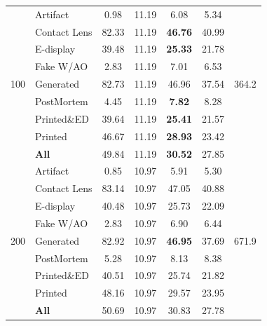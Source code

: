 \begin{table}[!htbp]
\begin{tabular}{l l c c c c c}
\multirow{9}{*}{100}
& Artifact             &   0.98 &  11.19 &           6.08 &    5.34 & \multirow{9}{*}{364.2} \\
& Contact Lens         &  82.33 &  11.19 & \textbf{46.76} &   40.99 &  \\
& E-display            &  39.48 &  11.19 & \textbf{25.33} &   21.78 &  \\
& Fake W/AO            &   2.83 &  11.19 &           7.01 &    6.53 &  \\
& Generated            &  82.73 &  11.19 &          46.96 &   37.54 &  \\
& PostMortem           &   4.45 &  11.19 &  \textbf{7.82} &    8.28 &  \\
& Printed\&ED          &  39.64 &  11.19 & \textbf{25.41} &   21.57 &  \\
& Printed              &  46.67 &  11.19 & \textbf{28.93} &   23.42 &  \\
& \textbf{All}             &  49.84 &  11.19 & \textbf{30.52} &   27.85 & \\
\midrule

\multirow{9}{*}{200}
& Artifact             &   0.85 &  10.97 &           5.91 &    5.30 & \multirow{9}{*}{671.9} \\
& Contact Lens         &  83.14 &  10.97 &          47.05 &   40.88 &  \\
& E-display            &  40.48 &  10.97 &          25.73 &   22.09 &  \\
& Fake W/AO            &   2.83 &  10.97 &           6.90 &    6.44 &  \\
& Generated            &  82.92 &  10.97 & \textbf{46.95} &   37.69 &  \\
& PostMortem           &   5.28 &  10.97 &           8.13 &    8.38 &  \\
& Printed\&ED          &  40.51 &  10.97 &          25.74 &   21.82 &  \\
& Printed              &  48.16 &  10.97 &          29.57 &   23.95 &  \\
& \textbf{All}             &  50.69 &  10.97 &          30.83 &   27.78 & \\

\bottomrule
\end{tabular}
\end{table}